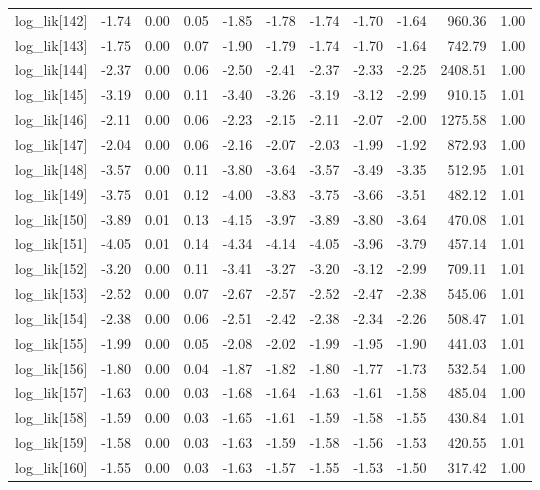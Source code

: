 \begin{table}[ht]
\begin{tabular}{rrrrrrrrrrr}
  log\_lik[142] & -1.74 & 0.00 & 0.05 & -1.85 & -1.78 & -1.74 & -1.70 & -1.64 & 960.36 & 1.00 \\ 
  log\_lik[143] & -1.75 & 0.00 & 0.07 & -1.90 & -1.79 & -1.74 & -1.70 & -1.64 & 742.79 & 1.00 \\ 
  log\_lik[144] & -2.37 & 0.00 & 0.06 & -2.50 & -2.41 & -2.37 & -2.33 & -2.25 & 2408.51 & 1.00 \\ 
  log\_lik[145] & -3.19 & 0.00 & 0.11 & -3.40 & -3.26 & -3.19 & -3.12 & -2.99 & 910.15 & 1.01 \\ 
  log\_lik[146] & -2.11 & 0.00 & 0.06 & -2.23 & -2.15 & -2.11 & -2.07 & -2.00 & 1275.58 & 1.00 \\ 
  log\_lik[147] & -2.04 & 0.00 & 0.06 & -2.16 & -2.07 & -2.03 & -1.99 & -1.92 & 872.93 & 1.00 \\ 
  log\_lik[148] & -3.57 & 0.00 & 0.11 & -3.80 & -3.64 & -3.57 & -3.49 & -3.35 & 512.95 & 1.01 \\ 
  log\_lik[149] & -3.75 & 0.01 & 0.12 & -4.00 & -3.83 & -3.75 & -3.66 & -3.51 & 482.12 & 1.01 \\ 
  log\_lik[150] & -3.89 & 0.01 & 0.13 & -4.15 & -3.97 & -3.89 & -3.80 & -3.64 & 470.08 & 1.01 \\ 
  log\_lik[151] & -4.05 & 0.01 & 0.14 & -4.34 & -4.14 & -4.05 & -3.96 & -3.79 & 457.14 & 1.01 \\ 
  log\_lik[152] & -3.20 & 0.00 & 0.11 & -3.41 & -3.27 & -3.20 & -3.12 & -2.99 & 709.11 & 1.01 \\ 
  log\_lik[153] & -2.52 & 0.00 & 0.07 & -2.67 & -2.57 & -2.52 & -2.47 & -2.38 & 545.06 & 1.01 \\ 
  log\_lik[154] & -2.38 & 0.00 & 0.06 & -2.51 & -2.42 & -2.38 & -2.34 & -2.26 & 508.47 & 1.01 \\ 
  log\_lik[155] & -1.99 & 0.00 & 0.05 & -2.08 & -2.02 & -1.99 & -1.95 & -1.90 & 441.03 & 1.01 \\ 
  log\_lik[156] & -1.80 & 0.00 & 0.04 & -1.87 & -1.82 & -1.80 & -1.77 & -1.73 & 532.54 & 1.00 \\ 
  log\_lik[157] & -1.63 & 0.00 & 0.03 & -1.68 & -1.64 & -1.63 & -1.61 & -1.58 & 485.04 & 1.00 \\ 
  log\_lik[158] & -1.59 & 0.00 & 0.03 & -1.65 & -1.61 & -1.59 & -1.58 & -1.55 & 430.84 & 1.01 \\ 
  log\_lik[159] & -1.58 & 0.00 & 0.03 & -1.63 & -1.59 & -1.58 & -1.56 & -1.53 & 420.55 & 1.01 \\ 
  log\_lik[160] & -1.55 & 0.00 & 0.03 & -1.63 & -1.57 & -1.55 & -1.53 & -1.50 & 317.42 & 1.00 \\ 

\end{tabular}
\end{table}
